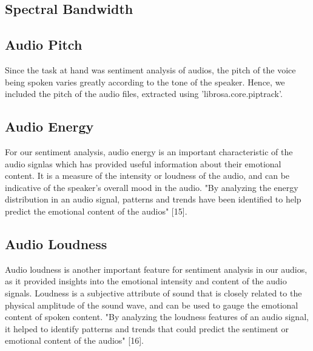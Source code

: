 \documentclass[conference]{IEEEtran}
\begin{document}
\subsection{Spectral Bandwidth}

\subsection{Audio Pitch}

Since the task at hand was sentiment analysis of audios, the pitch of the voice being spoken varies greatly according to the tone of the speaker. Hence, we included the pitch of the audio files, extracted using 'librosa.core.piptrack'.

\subsection{Audio Energy}
For our sentiment analysis, audio energy is an important characteristic of the audio signlas which has provided useful information about their emotional content. It is a measure of the intensity or loudness of the audio, and can be indicative of the speaker's overall mood in the audio. 
"By analyzing the energy distribution in an audio signal, patterns and trends have been identified to help predict the emotional content of the audios" [15].

\subsection{Audio Loudness}
Audio loudness is another important feature for sentiment analysis in our audios, as it provided insights into the emotional intensity and content of the audio signals. Loudness is a subjective attribute of sound that is closely related to the physical amplitude of the sound wave, and can be used to gauge the emotional content of spoken content. "By analyzing the loudness features of an audio signal, it helped to identify patterns and trends that could predict the sentiment or emotional content of the audios" [16].
\end{document}

